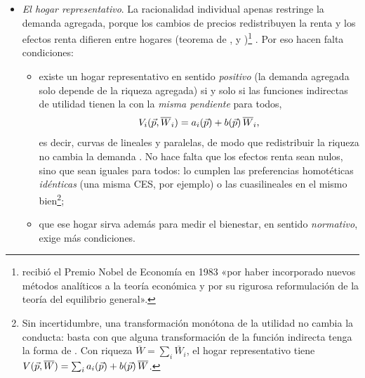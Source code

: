 \documentclass[11pt]{article}
\begin{document}
\begin{itemize}
  \begin{enumerate}
  \item un agente cualquiera, si todos son idénticos;
  \item el agente «medio» de la colectividad;
  \item un agente, quizá ficticio, cuyas decisiones coinciden con las agregadas de la colectividad a la que representa.
  \end{enumerate}
  El tercero es el útil, y obliga a preguntarse cuándo existe.
\item \emph{El hogar representativo}. La racionalidad individual apenas restringe la demanda agregada, porque los cambios de precios redistribuyen la renta y los efectos renta difieren entre hogares (teorema de ,  y )\footnote{ recibió el Premio Nobel de Economía en 1983 «por haber incorporado nuevos métodos analíticos a la teoría económica y por su rigurosa reformulación de la teoría del equilibrio general»\nocite{Nobel1983Debreu}.} . Por eso hacen falta condiciones:
  \begin{itemize}
  \item existe un hogar representativo en sentido \emph{positivo} (la demanda agregada solo depende de la riqueza agregada) si y solo si las funciones indirectas de utilidad tienen la  con la \emph{misma pendiente} para todos,
    \begin{equation*}
    V_i(\vec{p},\overline W_i)=a_i(\vec{p})+b(\vec{p})\,\overline W_i,
    \end{equation*}
    es decir, curvas de  lineales y paralelas, de modo que redistribuir la riqueza no cambia la demanda\nocite{Gorman1953Community} . No hace falta que los efectos renta sean nulos, sino que sean iguales para todos: lo cumplen las preferencias homotéticas \emph{idénticas} (una misma CES, por ejemplo) o las cuasilineales en el mismo bien\footnote{Sin incertidumbre, una transformación monótona de la utilidad no cambia la conducta: basta con que alguna transformación de la función indirecta tenga la forma de . Con riqueza $\overline W=\sum_i\overline W_i$, el hogar representativo tiene $V(\vec{p},\overline W)=\sum_ia_i(\vec{p})+b(\vec{p})\,\overline W$.};
  \item que ese hogar sirva además para medir el bienestar, en sentido \emph{normativo}, exige más condiciones\nocite{Acemoglu2009}.
  \end{itemize}

\end{itemize}
\end{document}

